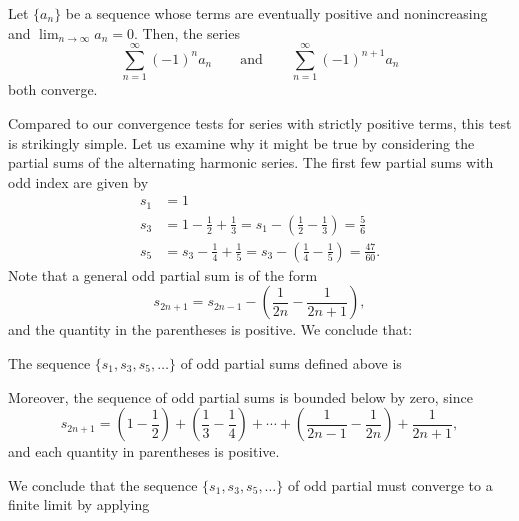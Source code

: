 \documentclass{ximera}
\begin{document}
\begin{theorem}
Let $\{a_n\}$ be a sequence whose terms are eventually positive and nonincreasing and
$\lim_{n\to\infty}a_n=0$. Then, the series 
\[
\sum_{n=1}^\infty (-1)^{n}a_n \qquad \text{and}\qquad \sum_{n=1}^\infty (-1)^{n+1}a_n 
\]
both converge.
\end{theorem}

Compared to our convergence tests for series with strictly positive terms, this test is strikingly simple. Let us examine why it might be true by considering the partial sums of the alternating harmonic series. The first few partial sums with odd index are given by 
\begin{align*}
s_1 &= 1 \\
s_3 &= 1 - \frac{1}{2} + \frac{1}{3} = s_1 - \left(\frac{1}{2} - \frac{1}{3}\right) = \frac{5}{6} \\
s_5 &= s_3 - \frac{1}{4} + \frac{1}{5} = s_3 - \left( \frac{1}{4} - \frac{1}{5}\right) = \frac{47}{60}.
\end{align*}
Note that a general odd partial sum is of the form
$$
s_{2n+1} = s_{2n-1} - \left(\frac{1}{2n} - \frac{1}{2n+1}\right),
$$
and the quantity in the parentheses is positive. We conclude that:

\begin{question}
The sequence $\{s_1,s_3,s_5,\ldots\}$ of odd partial sums defined above is 
\begin{prompt}
        \begin{multipleChoice}
        \end{multipleChoice}
 \end{prompt}
 \end{question}
        
        

Moreover, the sequence of odd partial sums is bounded below by zero, since
$$
s_{2n+1} = \left(1 - \frac{1}{2}\right) + \left(\frac{1}{3} - \frac{1}{4}\right) + \cdots + \left(\frac{1}{2n-1}-\frac{1}{2n}\right) + \frac{1}{2n+1},
$$
and each quantity in parentheses is positive. 

\begin{question}
We conclude that the sequence $\{s_1,s_3,s_5,\ldots\}$ of odd partial must converge to a finite limit by applying
\begin{prompt}
        \begin{multipleChoice}
        \end{multipleChoice}
 \end{prompt}
 \end{question}
 
\end{document}
